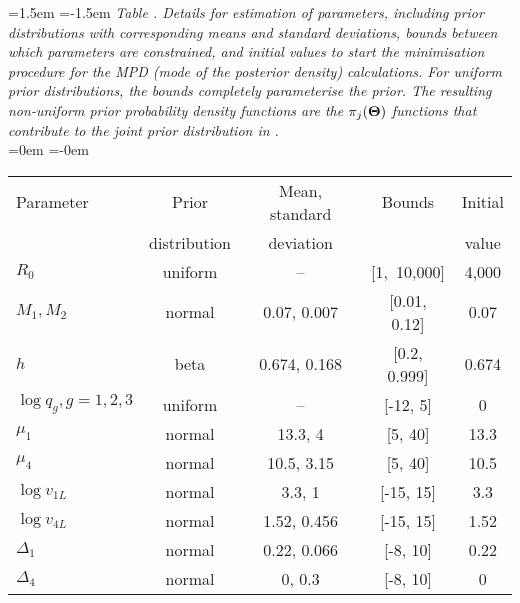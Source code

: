 \begin{table}[tp]
\leftskip=1.5em
\parindent=-1.5em
{\it Table . Details for estimation of parameters, including prior distributions with corresponding means and standard deviations, bounds between which parameters are constrained, and initial values to start the minimisation procedure for the MPD (mode of the posterior density) calculations. For uniform prior distributions, the bounds completely parameterise the prior. The resulting non-uniform prior probability density functions are the $\pi_j({\bf \Theta})$ functions that contribute to the joint prior distribution in .}
\vsd \\
\leftskip=0em
\parindent=-0em
\begin{tabular}{lcccc} 
\hline
Parameter & Prior         & Mean, standard & Bounds & Initial\\ 
          &  distribution &  deviation     &  & value\\ 
\hline %
%
$R_0$ & uniform & -- & [1,~10,000] & 4,000\\
$M_{1}, M_{2}$ & normal & 0.07, 0.007 & [0.01, 0.12] & 0.07\\
$h$ & beta & 0.674, 0.168 & [0.2, 0.999] & 0.674\\
$\log q_g, g=1,2,3$ & uniform & -- & [-12, 5] & 0\\
$\mu_1$ & normal & 13.3, 4 & [5, 40] & 13.3\\
$\mu_4$ & normal & 10.5, 3.15 & [5, 40] & 10.5\\
$\log v_{1L}$ & normal & 3.3, 1 & [-15, 15] & 3.3\\
$\log v_{4L}$ & normal & 1.52, 0.456 & [-15, 15] & 1.52\\
$\Delta_1$ & normal & 0.22, 0.066 & [-8, 10] & 0.22\\
$\Delta_4$ & normal & 0, 0.3 & [-8, 10] & 0\\
\hline 
\end{tabular} 
\vsd
\end{table}

